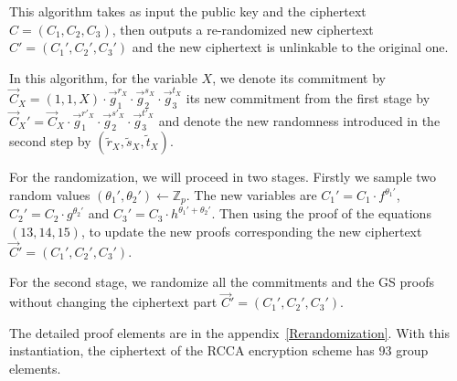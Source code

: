 This algorithm takes as input the public key and the ciphertext $C = (C_1, C_2, C_3)$, then outputs a re-randomized new ciphertext $C' = (C_1', C_2', C_3')$ and the new ciphertext is unlinkable to the original one.

In this algorithm, for the variable $X$, we denote its commitment by $\vec{C}_X = (1, 1, X) \cdot \vec{g}_1^{r_X} \cdot \vec{g}_2^{s_X} \cdot \vec{g}_3^{t_X}$ its new commitment from the first stage by $\vec{C}_X' = \vec{C}_X \cdot \vec{g}_1^{r'_X} \cdot \vec{g}_2^{s'_X} \cdot \vec{g}_3^{t'_X}$ and denote the new randomness introduced in the second step by $(\tilde{r}_X, \tilde{s}_X, \tilde{t}_X)$.

For the randomization, we will proceed in two stages. Firstly we sample two random values $(\theta_1', \theta_2') \gets \mathbb{Z}_p$. The new variables are $C_1' = C_1 \cdot f^{\theta_1'}$, $C_2' = C_2 \cdot g^{\theta_2'}$ and $C_3' = C_3 \cdot h^{\theta_1'+\theta_2'}$. Then using the proof of the equations $(13, 14, 15)$, to update the new proofs corresponding the new ciphertext $\vec{C}' = (C_1', C_2', C_3')$.

For the second stage, we randomize all the commitments and the GS proofs without changing the ciphertext part $\vec{C}' = (C_1', C_2', C_3')$.

The detailed proof elements are in the appendix~\ref{Rerandomization}. With this instantiation, the ciphertext of the RCCA encryption scheme has $93$ group elements.
